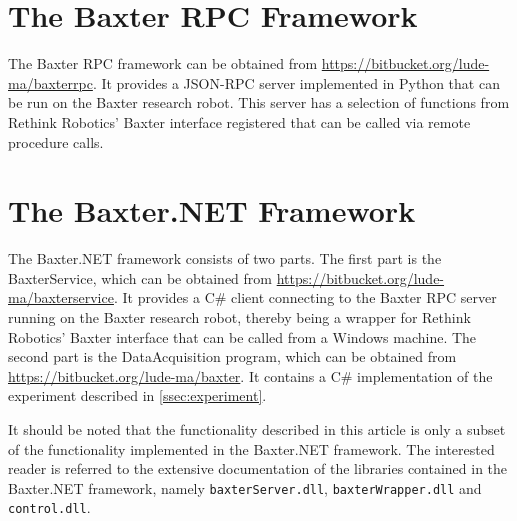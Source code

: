 \documentclass{scrartcl}
\newcommand{\baxterdotnet}{Baxter.NET\xspace}
\newcommand{\baxterrpc}{Baxter RPC\xspace}
\begin{document}
%    
%    


\appendix

\section{The \baxterrpc Framework}
\label{sec:baxterrpc}
    The \baxterrpc framework can be obtained from \url{https://bitbucket.org/lude-ma/baxterrpc}.
    It provides a JSON-RPC server implemented in Python that can be run on the Baxter research robot.
    This server has a selection of functions from Rethink Robotics' Baxter interface registered that can be called via remote procedure calls.

\section{The \baxterdotnet Framework}
\label{sec:baxterdotnet}
    The \baxterdotnet framework consists of two parts.
    The first part is the BaxterService, which can be obtained from \url{https://bitbucket.org/lude-ma/baxterservice}.
    It provides a C\# client connecting to the \baxterrpc server running on the Baxter research robot, thereby being a wrapper for Rethink Robotics' Baxter interface that can be called from a Windows machine.
    The second part is the DataAcquisition program, which can be obtained from \url{https://bitbucket.org/lude-ma/baxter}.
    It contains a C\# implementation of the experiment described in \cref{ssec:experiment}.
    
    It should be noted that the functionality described in this article is only a subset of the functionality implemented in the \baxterdotnet framework.
    The interested reader is referred to the extensive documentation of the libraries contained in the \baxterdotnet framework, namely \verb|baxterServer.dll|, \verb|baxterWrapper.dll| and \verb|control.dll|.
    
\end{document}

